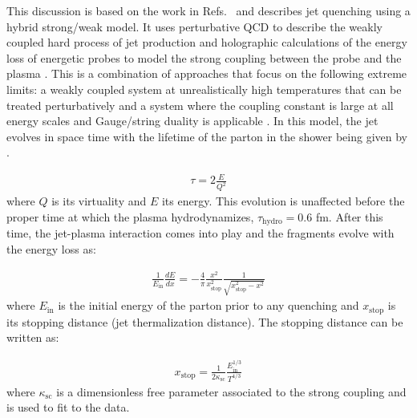
This discussion is based on the work in Refs.~\cite{Casalderrey-Solana:2014bpa, Hulcher:2017cpt, Casalderrey-Solana:2016jvj} and describes jet quenching using a hybrid strong/weak model.
It uses perturbative QCD to describe the weakly coupled hard process of jet production and holographic calculations of the energy loss of energetic probes to model the strong coupling between the probe and the plasma \cite{Chesler:2015nqz, Chesler:2014jva}.
This is a combination of approaches that focus on the following extreme limits: a weakly coupled system at unrealistically high temperatures that can be treated perturbatively \cite{Jacobs:2004qv, Majumder:2010qh} and a system where the coupling constant is large at all energy scales and Gauge/string duality is applicable \cite{CasalderreySolana:2011us}.
In this model, the jet evolves in space time with the lifetime of the parton in the shower being given by \cite{CasalderreySolana:2011gx}.
 

\begin{align}
\tau = 2 \frac{E}{Q^2}
\end{align}
where $Q$ is its virtuality and $E$ its energy.
This evolution is unaffected before the proper time at which the plasma hydrodynamizes, $\tau_{\text{hydro}} = 0.6$ fm.
After this time, the jet-plasma interaction comes into play and the fragments evolve with the energy loss as:

\begin{align}
\frac{1}{E_{\mathrm{in}}} \frac{dE}{dx} = -\frac{4}{\pi} \frac{x^2}{x_{\mathrm{stop}}^2} \frac{1}{\sqrt{x_{\mathrm{stop}}^2 - x^2}}
\end{align}
where $E_{\mathrm{in}}$ is the initial energy of the parton prior to any quenching and $x_{\mathrm{stop}}$ is its stopping distance (jet thermalization distance).
The stopping distance can be written as:

\begin{align}
x_\mathrm{stop} = \frac{1}{2\kappa_\mathrm{sc}} \frac{E_\mathrm{in}^{1/3}}{T^{4/3}}
\end{align}
where $\kappa_\mathrm{sc}$ is a dimensionless free parameter associated to the strong coupling and is used to fit to the data.

